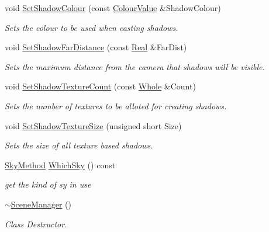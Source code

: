 \begin{DoxyCompactItemize}
void \hyperlink{classMezzanine_1_1SceneManager_a8bc4a68f885b85a3a023d632d932de65}{SetShadowColour} (const \hyperlink{classMezzanine_1_1ColourValue}{ColourValue} \&ShadowColour)
\begin{DoxyCompactList}\small\item\em Sets the colour to be used when casting shadows. \item\end{DoxyCompactList}\item 
void \hyperlink{classMezzanine_1_1SceneManager_a79b5c4f2edd3301134a6a2513b4deaa1}{SetShadowFarDistance} (const \hyperlink{namespaceMezzanine_a726731b1a7df72bf3583e4a97282c6f6}{Real} \&FarDist)
\begin{DoxyCompactList}\small\item\em Sets the maximum distance from the camera that shadows will be visible. \item\end{DoxyCompactList}\item 
void \hyperlink{classMezzanine_1_1SceneManager_a9d959f0128e2aa14aeb9d425cd9631d2}{SetShadowTextureCount} (const \hyperlink{namespaceMezzanine_adcbb6ce6d1eb4379d109e51171e2e493}{Whole} \&Count)
\begin{DoxyCompactList}\small\item\em Sets the number of textures to be alloted for creating shadows. \item\end{DoxyCompactList}\item 
void \hyperlink{classMezzanine_1_1SceneManager_a303b871aa1475605d2711239d4d088ac}{SetShadowTextureSize} (unsigned short Size)
\begin{DoxyCompactList}\small\item\em Sets the size of all texture based shadows. \item\end{DoxyCompactList}\item 
\hyperlink{classMezzanine_1_1SceneManager_a80fac0c0b67191cb5450bddde74b470e}{SkyMethod} \hyperlink{classMezzanine_1_1SceneManager_a53459adabe43b627fae6c1cdad5094f6}{WhichSky} () const 
\begin{DoxyCompactList}\small\item\em get the kind of sy in use \item\end{DoxyCompactList}\item 
\hyperlink{classMezzanine_1_1SceneManager_a8becb78de62a9e5c66c213066e7a421b}{$\sim$SceneManager} ()
\begin{DoxyCompactList}\small\item\em Class Destructor. \item\end{DoxyCompactList}\end{DoxyCompactItemize}
